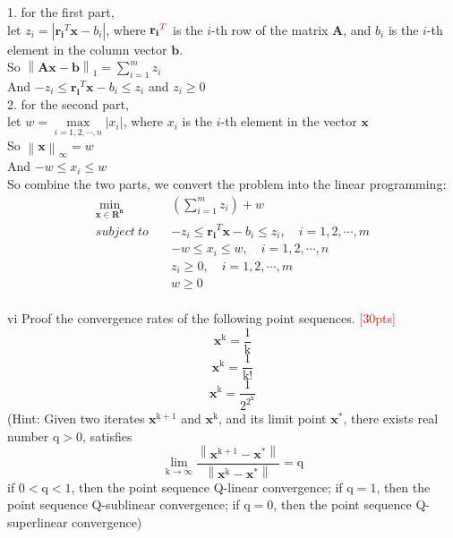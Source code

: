     1. for the first part,\\
    let $z_i = |\mathbf{r_i}^T\mathbf{x}-b_i|$, where $\mathbf{r_i}\textcolor{red}{^T}$ is the $i$-th row of the matrix $\mathbf{A}$, and $b_i$ is the $i$-th element in the column vector $\mathbf{b}$.\\
    So $\left\|\mathbf{Ax}-\mathbf{b}\right\|_1=\sum\limits_{i=1}^m z_i$\\
    And $-z_i \leq \mathbf{r_i}^T\mathbf{x}-b_i \leq z_i$ and $z_i \geq 0$\\

    2. for the second part,\\
    let $w = \max\limits_{i=1,2,\cdots,n}|x_i|$, where $x_i$ is the $i$-th element in the vector $\mathbf{x}$\\
    So $\left\|\mathbf{x}\right\|_\infty=w$\\
    And $-w \leq x_i \leq w$\\
    
    So combine the two parts, we convert the problem into the linear programming:\\
    \begin{equation*}
        \begin{aligned}
            \min_{\mathbf{x}\in\mathbf{R^{n}}}\quad & (\sum\limits_{i=1}^m z_i) + w\\
            subject\ to \quad & -z_i \leq \mathbf{r_i}^T\mathbf{x}-b_i \leq z_i, \quad i=1,2,\cdots,m\\
            & -w \leq x_i\leq w, \quad i=1,2,\cdots,n\\
            & z_i \geq 0, \quad i=1,2,\cdots,m\\
            & w\geq 0\\
        \end{aligned}
    \end{equation*}


\newpage
\begin{problem}{vi}
Proof the convergence rates of the following point sequences.
\textcolor{red}{[30pts]}$$\mathbf{x^{\mathrm{k}}}=\frac{\mathrm{1}}{\mathrm{k}}$$$$\mathbf{x^{\mathrm{k}}}=\frac{\mathrm{1}}{\mathrm{k!}}$$$$\mathbf{x^{\mathrm{k}}}=\frac{\mathrm{1}}{\mathrm{2^{2^{k}}}}$$(Hint: Given two iterates $\mathbf{x^{\mathrm{k+1}}}$ and $\mathbf{x^{\mathrm{k}}}$, and its limit point $\mathbf{x^{\mathrm{*}}}$, there exists real number $\mathrm{q > 0}$, satisfies $$\lim_{\mathrm{k\rightarrow\infty}}\frac{\left\|\mathbf{x^{\mathrm{k+1}}}-\mathbf{x^{\mathrm{*}}}\right\|}{\left\|\mathbf{x^{\mathrm{k}}}-\mathbf{x^{\mathrm{*}}}\right\|} = \mathrm{q}$$ if $\mathrm{0<q<1}$, then the point sequence Q-linear convergence; if $\mathrm{q=1}$, then the point sequence Q-sublinear convergence; if $\mathrm{q=0}$, then the point sequence Q-superlinear convergence)
\end{problem}

